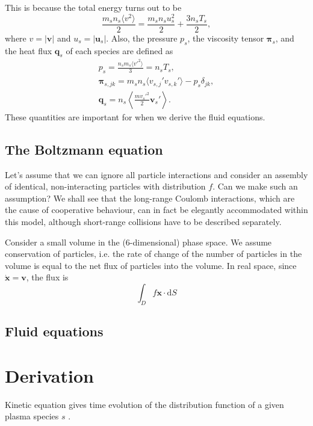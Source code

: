 \documentclass[12pt]{article}
\begin{document}
%
This is because the total energy turns out to be
%
\begin{equation}
    \frac{m_s n_s \langle v^2 \rangle}{2} = \frac{m_s n_s u_s^2}{2} + \frac{3 n_s T_s}{2} ,
\end{equation}
%
where $v = |\bm{v}|$ and $u_s = |\bm{u}_s|$. Also, the pressure $p_s$, the viscosity tensor $\bm{\pi}_s$, and the heat flux $\bm{q}_s$ of each species are defined as
%
\begin{gather}
    p_s = \frac{n_s m_s \langle v'^2 \rangle}{3} = n_s T_s , \\
    \bm{\pi}_{s,jk} = m_s n_s \langle v_{s,j}'v_{s,k}' \rangle - p_s \delta_{jk} , \\
    \bm{q}_s = n_s \left\langle \frac{m v_s'^2}{2} \bm{v}_s' \right\rangle .
\end{gather}
%
These quantities are important for when we derive the fluid equations.

\subsection{The Boltzmann equation}

Let's assume that we can ignore all particle interactions and consider an assembly of identical, non-interacting particles with distribution $f$. Can we make such an assumption? We shall see that the long-range Coulomb interactions, which are the cause of cooperative behaviour, can in fact be elegantly accommodated within this model, although short-range collisions have to be described separately.

Consider a small volume in the (6-dimensional) phase space. We assume conservation of particles, i.e. the rate of change of the number of particles in the volume is equal to the net flux of particles into the volume. In real space, since $\dot{\bm{x}} = \bm{v}$, the flux is
%
\begin{equation}
    \int_D f \bm{x} \cdot \mathrm{d}S
\end{equation}

\subsection{Fluid equations}

\section{Derivation}

Kinetic equation gives time evolution of the distribution function of a given plasma species $s$ .
\end{document}
